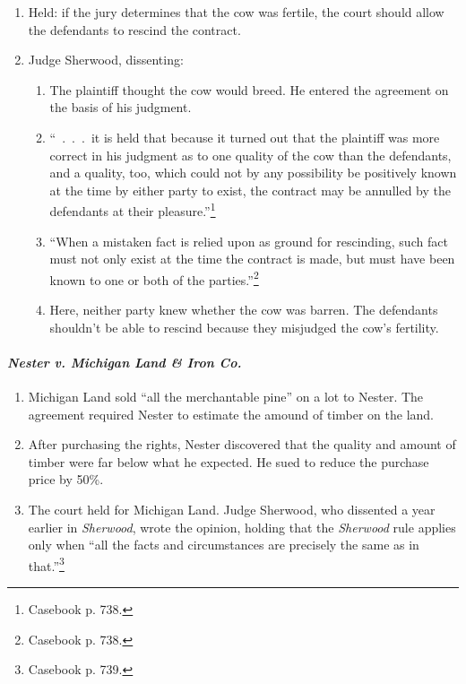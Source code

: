 {\begin{enumerate}
    \item Held: if the jury determines that the cow was fertile, the court 
    should allow the defendants to rescind the contract.
    \item Judge Sherwood, dissenting:
    \begin{enumerate}
        \item The plaintiff thought the cow would breed. He entered the 
        agreement on the basis of his judgment. 
        \item ``~.~.~.~it is held that because it turned out that the 
        plaintiff was more correct in his judgment as to one quality of the 
        cow than the defendants, and a quality, too, which could not by any 
        possibility be positively known at the time by either party to exist, 
        the contract may be annulled by the defendants at their 
        pleasure.''\footnote{Casebook p. 738.}
        \item ``When a mistaken fact is relied upon as ground for rescinding, 
        such fact must not only exist at the time the contract is made, but 
        must have been known to one or both of the 
        parties.''\footnote{Casebook p. 738.}
        \item Here, neither party knew whether the cow was barren. The 
        defendants shouldn't be able to rescind because they misjudged the 
        cow's fertility.
    \end{enumerate}
\end{enumerate}

\paragraph{\emph{Nester v. Michigan Land \& Iron Co.}}

\begin{enumerate}
    \item Michigan Land sold ``all the merchantable pine'' on a lot to Nester. 
    The agreement required Nester to estimate the amound of timber on the 
    land.
    \item After purchasing the rights, Nester discovered that the quality and 
    amount of timber were far below what he expected. He sued to reduce the 
    purchase price by 50\%.
    \item The court held for Michigan Land. Judge Sherwood, who dissented a 
    year earlier in \emph{Sherwood}, wrote the opinion, holding that the 
    \emph{Sherwood} rule applies only when ``all the facts and circumstances 
    are precisely the same as in that.''\footnote{Casebook p. 739.}
\end{enumerate}

}
